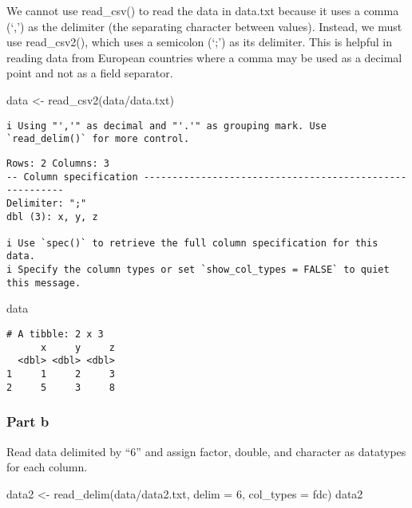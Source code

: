 \documentclass[
  letterpaper,
  DIV=11,
  numbers=noendperiod]{scrartcl}
\newenvironment{Shaded}{\begin{snugshade}}{\end{snugshade}}
\newcommand{\AttributeTok}[1]{\textcolor[rgb]{0.40,0.45,0.13}{#1}}
\newcommand{\FunctionTok}[1]{\textcolor[rgb]{0.28,0.35,0.67}{#1}}
\newcommand{\NormalTok}[1]{\textcolor[rgb]{0.00,0.23,0.31}{#1}}
\newcommand{\OtherTok}[1]{\textcolor[rgb]{0.00,0.23,0.31}{#1}}
\newcommand{\StringTok}[1]{\textcolor[rgb]{0.13,0.47,0.30}{#1}}
\begin{document}
We cannot use read\_csv() to read the data in data.txt because it uses a
comma (`,') as the delimiter (the separating character between values).
Instead, we must use read\_csv2(), which uses a semicolon (`;') as its
delimiter. This is helpful in reading data from European countries where
a comma may be used as a decimal point and not as a field separator.

\begin{Shaded}
\begin{Highlighting}[]
\NormalTok{data }\OtherTok{\textless{}{-}} \FunctionTok{read\_csv2}\NormalTok{(}\StringTok{\textquotesingle{}data/data.txt\textquotesingle{}}\NormalTok{)}
\end{Highlighting}
\end{Shaded}

\begin{verbatim}
i Using "','" as decimal and "'.'" as grouping mark. Use `read_delim()` for more control.
\end{verbatim}

\begin{verbatim}
Rows: 2 Columns: 3
-- Column specification --------------------------------------------------------
Delimiter: ";"
dbl (3): x, y, z

i Use `spec()` to retrieve the full column specification for this data.
i Specify the column types or set `show_col_types = FALSE` to quiet this message.
\end{verbatim}

\begin{Shaded}
\begin{Highlighting}[]
\NormalTok{data}
\end{Highlighting}
\end{Shaded}

\begin{verbatim}
# A tibble: 2 x 3
      x     y     z
  <dbl> <dbl> <dbl>
1     1     2     3
2     5     3     8
\end{verbatim}

\subsubsection{Part b}\label{part-b}

Read data delimited by ``6'' and assign factor, double, and character as
datatypes for each column.

\begin{Shaded}
\begin{Highlighting}[]
\NormalTok{data2 }\OtherTok{\textless{}{-}} \FunctionTok{read\_delim}\NormalTok{(}\StringTok{\textquotesingle{}data/data2.txt\textquotesingle{}}\NormalTok{, }\AttributeTok{delim =} \StringTok{\textquotesingle{}6\textquotesingle{}}\NormalTok{, }\AttributeTok{col\_types =} \StringTok{\textquotesingle{}fdc\textquotesingle{}}\NormalTok{)}
\NormalTok{data2}
\end{Highlighting}
\end{Shaded}
\end{document}

